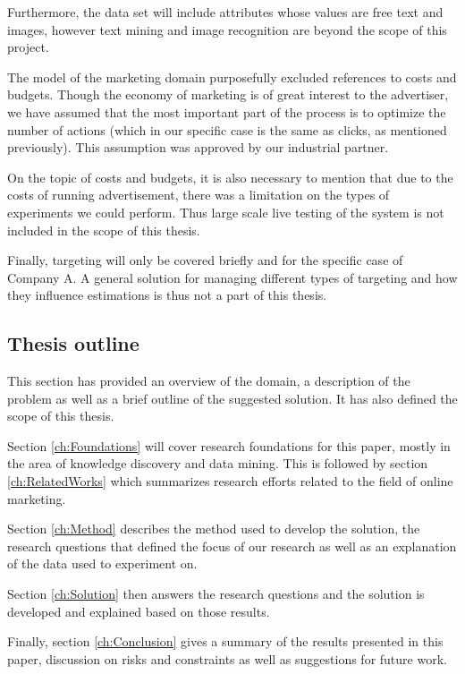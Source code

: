 \documentclass{sig-alternate}
\begin{document}
Furthermore, the data set will include attributes whose values are free text and images, however text mining and image recognition are beyond the scope of this project.

The model of the marketing domain purposefully excluded references to costs and budgets. Though the economy of marketing is of great interest to the advertiser, we have assumed that the most important part of the process is to optimize the number of actions (which in our specific case is the same as clicks, as mentioned previously). This assumption was approved by our industrial partner.

On the topic of costs and budgets, it is also necessary to mention that due to the costs of running advertisement, there was a limitation on the types of experiments we could perform. Thus large scale live testing of the system is not included in the scope of this thesis.

Finally, targeting will only be covered briefly and for the specific case of Company A. A general solution for managing different types of targeting and how they influence estimations is thus not a part of this thesis.

\subsection{Thesis outline}
This section has provided an overview of the domain, a description of the problem as well as a brief outline of the suggested solution. It has also defined the scope of this thesis.

Section \ref{ch:Foundations} will cover research foundations for this paper, mostly in the area of knowledge discovery and data mining. This is followed by section \ref{ch:RelatedWorks} which summarizes research efforts related to the field of online marketing.

Section \ref{ch:Method} describes the method used to develop the solution, the research questions that defined the focus of our research as well as an explanation of the data used to experiment on.

Section \ref{ch:Solution} then answers the research questions and the solution is developed and explained based on those results.

Finally, section \ref{ch:Conclusion} gives a summary of the results presented in this paper, discussion on risks and constraints as well as suggestions for future work.
\end{document}

